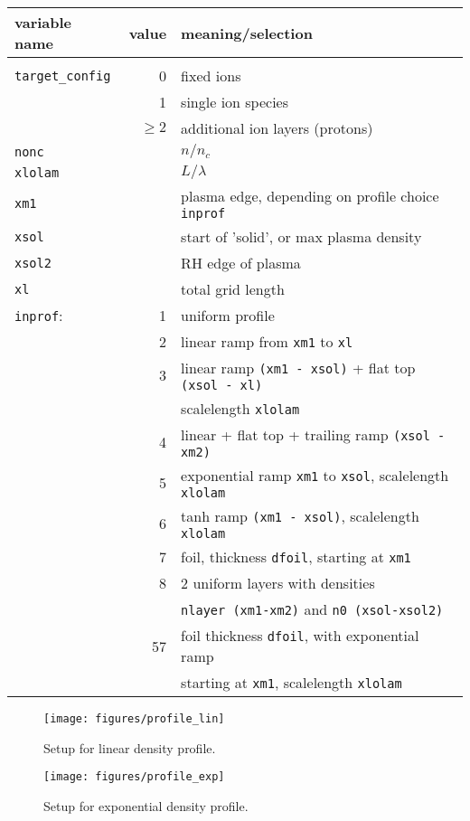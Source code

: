 \documentclass[11pt]{article}
\begin{document}
\begin{tabular}{lrl}
variable name & value & meaning/selection \\ 
\hline \\
\texttt{target\_config} & 0 & fixed ions \\
& 1 & single ion species \\
& $\geq 2$ & additional ion layers (protons) \\
\texttt{nonc} && $n/n_c$   \\ 
\texttt{xlolam} && $L/\lambda$   \\
\texttt{xm1} &&plasma edge, depending on profile choice \texttt{inprof}\\ 
\texttt{xsol} &&start of 'solid', or max plasma density\\ 
\texttt{xsol2} && RH edge of plasma\\ 
\texttt{xl}&& total grid length \\

\texttt{inprof}: & 1 & uniform profile\\
		&    2 & linear ramp from \texttt{xm1} to \texttt{xl} \\ 
& 3 & linear ramp \texttt{(xm1 - xsol)} + flat top \texttt{(xsol - xl)}\\ 
&   & scalelength \texttt{xlolam} \\ 
& 4 & linear + flat top + trailing ramp \texttt{(xsol - xm2)}\\ 
& 5 & exponential ramp \texttt{xm1} to \texttt{xsol}, scalelength \texttt{xlolam}\\
& 6 & tanh ramp \texttt{(xm1 - xsol)}, scalelength \texttt{xlolam}\\ 
& 7 & foil, thickness \texttt{dfoil}, starting at \texttt{xm1} \\ 
& 8 & 2 uniform layers with densities \\
&& \texttt{nlayer (xm1-xm2)} and  \texttt{n0 (xsol-xsol2)}\\ 
& 57 & foil thickness \texttt{dfoil}, with exponential ramp \\
&& starting at \texttt{xm1}, scalelength \texttt{xlolam}
\end{tabular} 

\begin{figure}[tb]
\begin{center}
\texttt{[image: figures/profile\_lin]}
\caption{Setup for linear density profile.}
\end{center}
\label{linear_profile}
\end{figure}
\begin{figure}[tb]
\begin{center}
\texttt{[image: figures/profile\_exp]}
\caption{Setup for exponential density profile.}
\end{center}
\end{figure}
\end{document}

